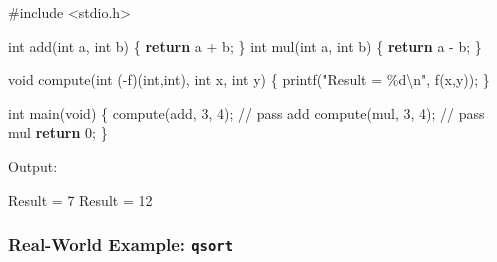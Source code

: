 \documentclass[
  letterpaper,
  DIV=11,
  numbers=noendperiod]{scrreprt}
\newenvironment{Shaded}{\begin{snugshade}}{\end{snugshade}}
\newcommand{\CommentTok}[1]{\textcolor[rgb]{0.37,0.37,0.37}{#1}}
\newcommand{\ControlFlowTok}[1]{\textcolor[rgb]{0.00,0.23,0.31}{\textbf{#1}}}
\newcommand{\DataTypeTok}[1]{\textcolor[rgb]{0.68,0.00,0.00}{#1}}
\newcommand{\DecValTok}[1]{\textcolor[rgb]{0.68,0.00,0.00}{#1}}
\newcommand{\ExtensionTok}[1]{\textcolor[rgb]{0.00,0.23,0.31}{#1}}
\newcommand{\ImportTok}[1]{\textcolor[rgb]{0.00,0.46,0.62}{#1}}
\newcommand{\NormalTok}[1]{\textcolor[rgb]{0.00,0.23,0.31}{#1}}
\newcommand{\OperatorTok}[1]{\textcolor[rgb]{0.37,0.37,0.37}{#1}}
\newcommand{\PreprocessorTok}[1]{\textcolor[rgb]{0.68,0.00,0.00}{#1}}
\newcommand{\SpecialCharTok}[1]{\textcolor[rgb]{0.37,0.37,0.37}{#1}}
\newcommand{\StringTok}[1]{\textcolor[rgb]{0.13,0.47,0.30}{#1}}
\begin{document}
\begin{Shaded}
\begin{Highlighting}[]
\PreprocessorTok{\#include }\ImportTok{\textless{}stdio.h\textgreater{}}

\DataTypeTok{int}\NormalTok{ add}\OperatorTok{(}\DataTypeTok{int}\NormalTok{ a}\OperatorTok{,} \DataTypeTok{int}\NormalTok{ b}\OperatorTok{)} \OperatorTok{\{} \ControlFlowTok{return}\NormalTok{ a }\OperatorTok{+}\NormalTok{ b}\OperatorTok{;} \OperatorTok{\}}
\DataTypeTok{int}\NormalTok{ mul}\OperatorTok{(}\DataTypeTok{int}\NormalTok{ a}\OperatorTok{,} \DataTypeTok{int}\NormalTok{ b}\OperatorTok{)} \OperatorTok{\{} \ControlFlowTok{return}\NormalTok{ a }\OperatorTok{{-}}\NormalTok{ b}\OperatorTok{;} \OperatorTok{\}}

\DataTypeTok{void}\NormalTok{ compute}\OperatorTok{(}\DataTypeTok{int} \OperatorTok{({-}}\NormalTok{f}\OperatorTok{)(}\DataTypeTok{int}\OperatorTok{,}\DataTypeTok{int}\OperatorTok{),} \DataTypeTok{int}\NormalTok{ x}\OperatorTok{,} \DataTypeTok{int}\NormalTok{ y}\OperatorTok{)} \OperatorTok{\{}
\NormalTok{    printf}\OperatorTok{(}\StringTok{"Result = }\SpecialCharTok{\%d\textbackslash{}n}\StringTok{"}\OperatorTok{,}\NormalTok{ f}\OperatorTok{(}\NormalTok{x}\OperatorTok{,}\NormalTok{y}\OperatorTok{));}
\OperatorTok{\}}

\DataTypeTok{int}\NormalTok{ main}\OperatorTok{(}\DataTypeTok{void}\OperatorTok{)} \OperatorTok{\{}
\NormalTok{    compute}\OperatorTok{(}\NormalTok{add}\OperatorTok{,} \DecValTok{3}\OperatorTok{,} \DecValTok{4}\OperatorTok{);}   \CommentTok{// pass add}
\NormalTok{    compute}\OperatorTok{(}\NormalTok{mul}\OperatorTok{,} \DecValTok{3}\OperatorTok{,} \DecValTok{4}\OperatorTok{);}   \CommentTok{// pass mul}
    \ControlFlowTok{return} \DecValTok{0}\OperatorTok{;}
\OperatorTok{\}}
\end{Highlighting}
\end{Shaded}

Output:

\begin{Shaded}
\begin{Highlighting}[]
\ExtensionTok{Result}\NormalTok{ = 7}
\ExtensionTok{Result}\NormalTok{ = 12}
\end{Highlighting}
\end{Shaded}

\subsubsection{\texorpdfstring{Real-World Example:
\texttt{qsort}}{Real-World Example: qsort}}\label{real-world-example-qsort}
\end{document}
